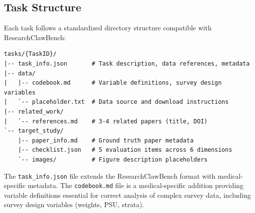 \documentclass[12pt]{article}
\begin{document}
\begin{table}[ht]
\centering
\caption{Domain coverage and primary methods in MedResearchBench.}
\end{table}

\subsection{Task Structure}

Each task follows a standardized directory structure compatible with ResearchClawBench:

\begin{lstlisting}
tasks/{TaskID}/
|-- task_info.json       # Task description, data references, metadata
|-- data/
|   |-- codebook.md      # Variable definitions, survey design variables
|   `-- placeholder.txt  # Data source and download instructions
|-- related_work/
|   `-- references.md    # 3-4 related papers (title, DOI)
`-- target_study/
    |-- paper_info.md    # Ground truth paper metadata
    |-- checklist.json   # 5 evaluation items across 6 dimensions
    `-- images/          # Figure description placeholders
\end{lstlisting}

The \texttt{task\_info.json} file extends the ResearchClawBench format with medical-specific metadata. The \texttt{codebook.md} file is a medical-specific addition providing variable definitions essential for correct analysis of complex survey data, including survey design variables (weights, PSU, strata).
\end{document}
